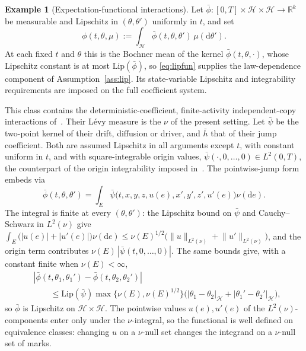 \documentclass[preprint,12pt]{elsarticle}
\newcommand{\R}{\mathbb{R}}
\newcommand{\diff}{\mathrm{d}}
\newcommand{\Lnu}{L^2(\nu)}
\newcommand{\Lnorm}[1]{\lVert #1\rVert_{\Lnu}}
\numberwithin{equation}{section}
\theoremstyle{plain}
\theoremstyle{definition}
\theoremstyle{\PaperRemarkStyle}
\newtheorem{example}[theorem]{Example}
\begin{document}
\begin{example}[Expectation-functional interactions]\label{ex:expfunc}
Let $\bar\phi:[0,T]\times\mathcal H\times\mathcal H\to\R^k$ be measurable and Lipschitz in
$(\theta,\theta')$ uniformly in $t$, and set
\[
\phi(t,\theta,\mu):=\int_{\mathcal H}\bar\phi(t,\theta,\theta')\,\mu(\diff\theta') .
\]
At each fixed $t$ and $\theta$ this is the Bochner mean of the kernel
$\bar\phi(t,\theta,\cdot)$, whose Lipschitz constant is at most $\mathrm{Lip}(\bar\phi)$, so
\eqref{eq:lipfun} supplies the law-dependence component of Assumption~\ref{ass:lip}. Its
state-variable Lipschitz and integrability requirements are imposed on the full coefficient
system.

This class contains the deterministic-coefficient, finite-activity independent-copy
interactions of~\cite{LiMin}. Their L\'evy measure is the $\nu$ of the present setting. Let
$\bar\psi$ be the two-point kernel of their drift, diffusion or driver, and $\bar h$ that of
their jump coefficient. Both are assumed Lipschitz in all arguments except $t$, with
constant uniform in $t$, and with square-integrable origin values,
$\bar\psi(\cdot,0,\dots,0)\in L^2(0,T)$, the counterpart of the origin integrability
imposed in~\cite[(H3.1)]{LiMin}.
The pointwise-jump form embeds via
\[
\bar\phi(t,\theta,\theta')=\int_E\bar\psi\bigl(t,x,y,z,u(e),x',y',z',u'(e)\bigr)\nu(\diff e).
\]
The integral is finite at every $(\theta,\theta')$: the Lipschitz bound on $\bar\psi$ and
Cauchy--Schwarz in $L^2(\nu)$ give
$\int_E\bigl(|u(e)|+|u'(e)|\bigr)\nu(\diff e)\le\nu(E)^{1/2}\bigl(\Lnorm{u}+\Lnorm{u'}\bigr)$,
and the origin term contributes $\nu(E)\,|\bar\psi(t,0,\dots,0)|$. The same bounds give,
with a constant finite when $\nu(E)<\infty$,
\[
\begin{aligned}
&|\bar\phi(t,\theta_1,\theta_1')-\bar\phi(t,\theta_2,\theta_2')|\\
&\qquad\le\mathrm{Lip}(\bar\psi)\max\{\nu(E),\nu(E)^{1/2}\}
\bigl(|\theta_1-\theta_2|_{\mathcal H}+|\theta_1'-\theta_2'|_{\mathcal H}\bigr),
\end{aligned}
\]
so $\bar\phi$ is Lipschitz on $\mathcal H\times\mathcal H$. The pointwise values $u(e),u'(e)$ of the
$L^2(\nu)$-components enter only under the $\nu$-integral, so the functional is
well defined on equivalence classes: changing $u$ on a $\nu$-null set changes the
integrand on a $\nu$-null set of marks.


\end{example}
\end{document}
